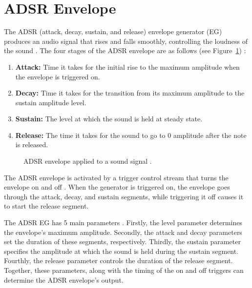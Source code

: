 \documentclass[12pt]{article}
\begin{document}
\section{ADSR Envelope}

The ADSR (attack, decay, sustain, and release) envelope generator (EG) produces an audio signal that rises and falls smoothly, controlling the loudness of the sound \cite{TTEM}. The four stages of the ADSR envelope are as follows (see Figure~\ref{fig:adsr}) \cite{MAMO}:
\begin{enumerate}
    \item \textbf{Attack:} Time it takes for the initial rise to the maximum amplitude when the envelope is triggered on. 
    \item \textbf{Decay:} Time it takes for the transition from its maximum amplitude to the sustain amplitude level.
    \item \textbf{Sustain:} The level at which the sound is held at steady state.
    \item \textbf{Release:} The time it takes for the sound to go to 0 amplitude after the note is released. 
\end{enumerate}

\begin{figure}[h!]
    \centering
    \caption{ADSR envelope applied to a sound signal \cite{MAMO}.}
    \label{fig:adsr}
\end{figure}

The ADSR envelope is activated by a trigger control stream that turns the envelope on and off \cite{TTEM}. When the generator is triggered on, the envelope goes through the attack, decay, and sustain segments, while triggering it off causes it to start the release segment. 
\vspace{1em}

The ADSR EG has 5 main parameters \cite{TTEM}. Firstly, the level parameter determines the envelope's maximum amplitude. Secondly, the attack and decay parameters set the duration of these segments, respectively. Thirdly, the sustain parameter specifies the amplitude at which the sound is held during the sustain segment. Fourthly, the release parameter controls the duration of the release segment. Together, these parameters, along with the timing of the on and off triggers can determine the ADSR envelope's output. 
\vspace{1em}
\end{document}
